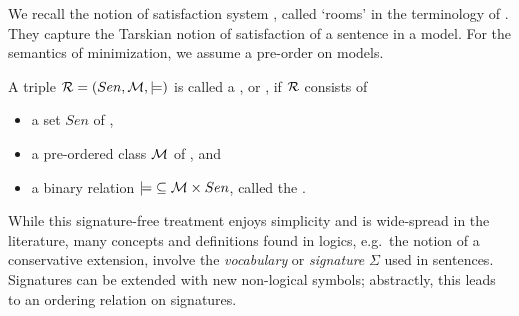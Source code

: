 \documentclass[10pt,%
\ifpretendfinal
final%
\else
draft%
\fi,
]{scrreprt}
\newcommand*{\syntax}[1]{\texttt{#1}}
\begin{document}




We recall the notion of satisfaction system \cite{carnielli2008analysis}, called `rooms' in the 
terminology of \cite{CharPar}. They capture the Tarskian notion of satisfaction of a
sentence in a model. For the semantics of minimization, we assume a pre-order on models.

\begin{definition}\label{def:room}
A triple ${\cal R}=(Sen,{{\cal M},\models)}$  is called a  , or , if ${\cal R}$  consists of
\begin{itemize}
\item a set $Sen$ of ,
\item a pre-ordered class
${\cal M}$ of , and
\item a binary relation
${\models}\subseteq {\cal M} \times Sen$, called the .
\end{itemize}
\end{definition}


While this signature-free treatment enjoys simplicity and is wide-spread in the literature, many 
concepts and definitions found in logics, e.g.\ the notion of a conservative extension, involve the
\emph{vocabulary} or \emph{signature} $\Sigma$ \label{vocabulary} used in sentences.  Signatures 
can be extended with new non-logical symbols; abstractly, this leads to an ordering relation on 
signatures.
\end{document}
